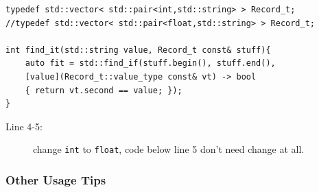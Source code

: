 \documentclass[a4paper,11pt,twoside]{book}
\begin{document}
\begin{itemize}
\begin{lstlisting}
typedef std::vector< std::pair<int,std::string> > Record_t;
//typedef std::vector< std::pair<float,std::string> > Record_t;

int find_it(std::string value, Record_t const& stuff){
	auto fit = std::find_if(stuff.begin(), stuff.end(),
	[value](Record_t::value_type const& vt) -> bool
	{ return vt.second == value; });
}
\end{lstlisting}
\begin{description}
	\item[Line 4-5:] change \texttt{int} to \texttt{float}, code below line 5 don't need change at all.
\end{description}

\end{itemize}

\subsubsection{Other Usage Tips}
\end{document}
